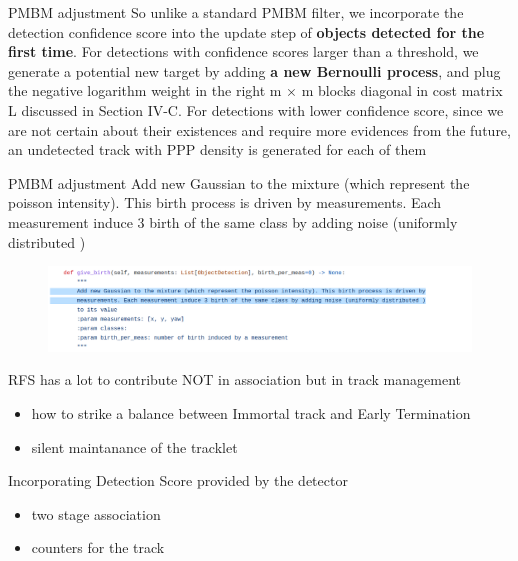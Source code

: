 \documentclass[aspectratio=169,xcolor=dvipsnames]{beamer}
\begin{document}
\begin{frame}{PMBM adjustment}
    So unlike a standard PMBM filter, we incorporate the detection confidence score into the update step 
    of \textbf{objects detected for the first time}. 
    For detections with confidence scores larger than a threshold, 
    we generate a potential new target by adding \textbf{a new Bernoulli process}, 
    and plug the negative logarithm weight in the right m × m blocks diagonal in cost matrix L 
    discussed in Section IV-C. For detections with lower confidence score, 
    since we are not certain about their existences and require more evidences from the future, 
    an undetected track with PPP density is generated for each of them
\end{frame}

\begin{frame}{PMBM adjustment}
    Add new Gaussian to the mixture (which represent the poisson intensity). This birth process is driven by
    measurements. Each measurement induce 3 birth of the same class by adding noise (uniformly distributed )
    \begin{figure}
        \includegraphics[width=0.9\linewidth]{pmbm/1.png}
    \end{figure}
\end{frame}

\begin{frame}{RFS has a lot to contribute NOT in association but in track management}
    \begin{itemize}
        \item{how to strike a balance between Immortal track and Early Termination}
        \item{silent maintanance of the tracklet}
    \end{itemize}
\end{frame}

\begin{frame}{Incorporating Detection Score provided by the detector}
    \begin{itemize}
        \item{two stage association}
        \item{counters for the track}
    \end{itemize}
\end{frame}
\end{document}
